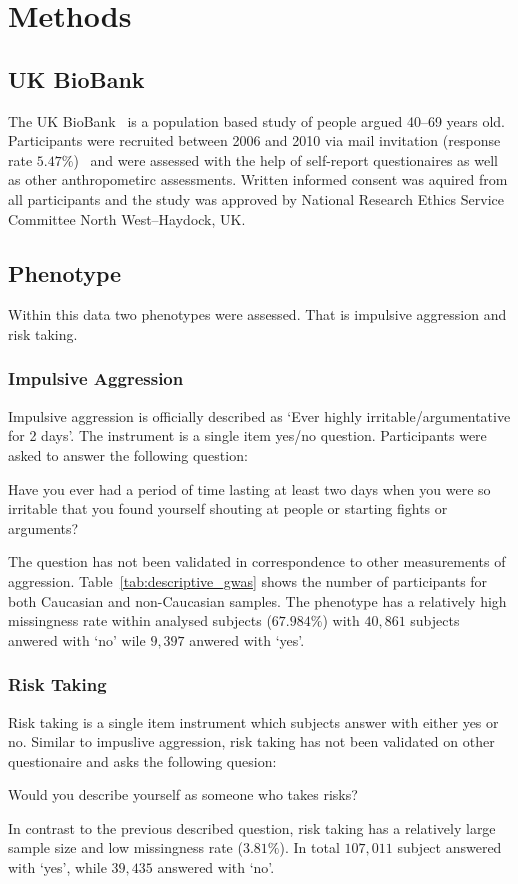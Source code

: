 \section{Methods}
\label{sec:methods}

\subsection{UK BioBank}
\label{sub:uk_biobank}
The UK BioBank~\cite{Allen2014} is a population based study of people argued 40--69 years old. 
Participants were recruited between 2006 and 2010 via mail invitation (response rate $5.47\%$)~\cite{Sudlow2015} and were assessed with the help of self-report questionaires as well as other anthropometirc assessments.
Written informed consent was aquired from all participants and the study was approved by National Research Ethics Service Committee North West–Haydock, UK\@.

\subsection{Phenotype}
\label{sub:phenotype}

Within this data two phenotypes were assessed.
That is impulsive aggression and risk taking.

\subsubsection{Impulsive Aggression}
\label{ssub:impulsive_aggression}
Impulsive aggression is officially described as `Ever highly irritable/argumentative for 2 days'.
The instrument is a single item yes/no question. 
Participants were asked to answer the following question:
\begin{displayquote}
  Have you ever had a period of time lasting at least two days when you were so irritable that you found yourself shouting at people or starting fights or arguments?
\end{displayquote}
The question has not been validated in correspondence to other measurements of aggression.
Table~\ref{tab:descriptive_gwas} shows the number of participants for both Caucasian and non-Caucasian samples.
The phenotype has a relatively high missingness rate within analysed subjects ($67.984\%$) with $40,861$ subjects anwered with `no' wile $9,397$ anwered with `yes'.

\subsubsection{Risk Taking}
\label{ssub:risk_taking}
Risk taking is a single item instrument which subjects answer with either yes or no.
Similar to impuslive aggression, risk taking has not been validated on other questionaire and asks the following quesion:
\begin{displayquote}
  Would you describe yourself as someone who takes risks?
\end{displayquote}
In contrast to the previous described question, risk taking has a relatively large sample size and low missingness rate ($3.81\%$).
In total $107,011$ subject answered with `yes', while $39,435$ answered with `no'.


